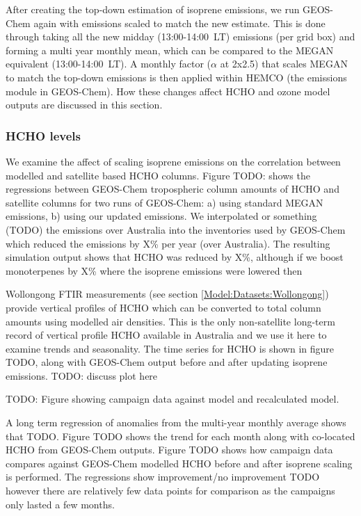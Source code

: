     After creating the top-down estimation of isoprene emissions, we run GEOS-Chem again with emissions scaled to match the new estimate. 
    This is done through taking all the new midday (13:00-14:00~LT) emissions (per grid box) and forming a multi year monthly mean, which can be compared to the MEGAN equivalent (13:00-14:00~LT).
    A monthly factor ($\alpha$ at 2x2.5\degr) that scales MEGAN to match the top-down emissions is then applied within HEMCO (the emissions module in GEOS-Chem).
    How these changes affect HCHO and ozone model outputs are discussed in this section.
  
    \subsubsection{HCHO levels}
    
      We examine the affect of scaling isoprene emissions on the correlation between modelled and satellite based HCHO columns.
      Figure TODO: shows the regressions between GEOS-Chem tropospheric column amounts of HCHO and satellite columns for two runs of GEOS-Chem: a) using standard MEGAN emissions, b) using our updated emissions.
      We interpolated or something (TODO) the emissions over Australia into the inventories used by GEOS-Chem which reduced the emissions by X\% per year (over Australia).
      The resulting simulation output shows that HCHO was reduced by X\%, although if we boost monoterpenes by X\% where the isoprene emissions were lowered then 
      
      Wollongong FTIR measurements (see section \ref{Model:Datasets:Wollongong}) provide vertical profiles of HCHO which can be converted to total column amounts using modelled air densities.
      This is the only non-satellite long-term record of vertical profile HCHO available in Australia and we use it here to examine trends and seasonality.
      The time series for HCHO is shown in figure TODO, along with GEOS-Chem output before and after updating isoprene emissions.
      TODO: discuss plot here
              
      TODO: Figure showing campaign data against model and recalculated model.
              
      A long term regression of anomalies from the multi-year monthly average shows that TODO.
      Figure TODO shows the trend for each month along with co-located HCHO from GEOS-Chem outputs.
      Figure TODO shows how campaign data compares against GEOS-Chem modelled HCHO before and after isoprene scaling is performed. 
      The regressions show improvement/no improvement TODO however there are relatively few data points for comparison as the campaigns only lasted a few months.
      

